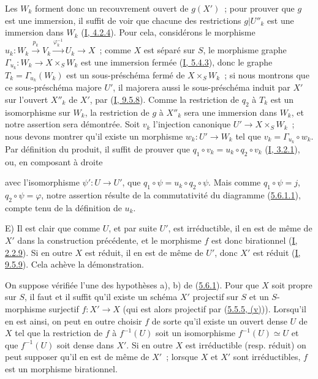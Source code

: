 Les $W_k$ forment donc un recouvrement ouvert de $g(X')$~; pour prouver que
$g$ est une immersion, il suffit de voir que chacune des restrictions
$g|U''_k$ est une immersion dans $W_k$
(\hyperref[I.4.2.4-fr]{I, 4.2.4}). Pour cela, considérons le morphisme
$u_k:W_k\xrightarrow{p_k}V_k\xrightarrow{\varphi_k^{-1}}U_k\to X$~; comme
$X$ est séparé sur $S$, le morphisme graphe
$\Gamma_{u_k}:W_k\to X\times_SW_k$ est une immersion fermée
(\hyperref[I.5.4.3-fr]{I, 5.4.3}), donc le graphe
$T_k=\Gamma_{u_k}(W_k)$ est un sous-préschéma fermé de $X\times_SW_k$~; si
nous montrons que ce sous-préschéma majore $U'$, il majorera aussi le
sous-préschéma induit par $X'$ sur l'ouvert $X''_k$ de $X'$, par
(\hyperref[I.9.5.8-fr]{I, 9.5.8}). Comme la restriction de $q_2$ à $T_k$ est
un isomorphisme sur $W_k$, la restriction de $g$ à $X''_k$ sera une immersion
dans $W_k$, et notre assertion sera démontrée. Soit $v_k$ l'injection
canonique $U'\to X\times_SW_k$~; nous devons montrer qu'il existe un morphisme
$w_k:U'\to W_k$ tel que $v_k=\Gamma_{u_k}\circ w_k$. Par définition du
produit, il suffit de prouver que
$q_1\circ v_k=u_k\circ q_2\circ v_k$
(\hyperref[I.3.2.1-fr]{I, 3.2.1}), ou, en composant à droite


avec l'isomorphisme $\psi':U\to U'$, que
$q_1\circ\psi=u_k\circ q_2\circ\psi$. Mais comme $q_1\circ\psi=j$,
$q_2\circ\psi=\varphi$, notre assertion résulte de la commutativité du
diagramme (\hyperref[II.5.6.1.1-fr]{5.6.1.1}), compte tenu de la définition de
$u_k$.

E) Il est clair que comme $U$, et par suite $U'$, est irréductible, il en est
de même de $X'$ dans la construction précédente, et le morphisme $f$ est donc
birationnel (\hyperref[I.2.2.9-fr]{I, 2.2.9}). Si en outre $X$ est réduit, il
en est de même de $U'$, donc $X'$ est réduit
(\hyperref[I.9.5.9-fr]{I, 9.5.9}). Cela achève la démonstration.

\begin{corollary}[5.6.2]
\label{II.5.6.2-fr}
On suppose vérifiée l'une des hypothèses a), b) de
(\hyperref[II.5.6.1-fr]{5.6.1}). Pour que $X$ soit propre sur $S$, il faut et
il suffit qu'il existe un schéma $X'$ projectif sur $S$ et un $S$-morphisme
surjectif $f:X'\to X$ (qui est alors projectif par
(\hyperref[II.5.5.5-fr]{5.5.5, (v)})). Lorsqu'il en est ainsi, on peut en
outre choisir $f$ de sorte qu'il existe un ouvert dense $U$ de $X$ tel que la
restriction de $f$ à $f^{-1}(U)$ soit un isomorphisme
$f^{-1}(U)\simeq U$ et que $f^{-1}(U)$ soit dense dans $X'$. Si en outre $X$
est irréductible (resp. réduit) on peut supposer qu'il en est de même de
$X'$~; lorsque $X$ et $X'$ sont irréductibles, $f$ est un morphisme
birationnel.
\end{corollary}

